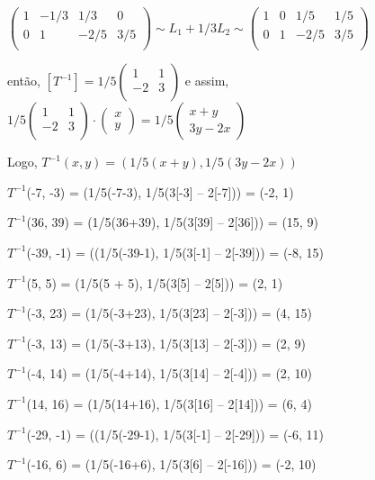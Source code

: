 $
\begin{pmatrix}
	1 & -1/3 & 1/3 & 0 \\
	0 & 1 & -2/5 & 3/5 \\
\end{pmatrix}
\sim L_1 + 1/3 L_2 \sim
\begin{pmatrix}
	1 & 0 & 1/5 & 1/5 \\
	0 & 1 & -2/5 & 3/5 \\
\end{pmatrix}
$

\noindent então, 
$[T^{-1}] = 1/5
\begin{pmatrix}
	1 & 1 \\
	-2 & 3 \\
\end{pmatrix}
$ e assim, $1/5
\begin{pmatrix}
	1 & 1 \\
	-2 & 3 \\
\end{pmatrix}
	\cdot
\begin{pmatrix}
	x \\ y
\end{pmatrix}
= 1/5\begin{pmatrix}
	x + y \\
	3y -2x
\end{pmatrix}
$

Logo, $T^{-1}(x, y) = (1/5(x + y), 1/5(3y -2x))$

\centerline{$T^{-1}$(-7, -3) = (1/5(-7-3), 1/5(3[-3] – 2[-7])) = (-2, 1)}

\centerline{$T^{-1}$(36, 39) = (1/5(36+39), 1/5(3[39] – 2[36])) = (15, 9)}

\centerline{$T^{-1}$(-39, -1) = ((1/5(-39-1), 1/5(3[-1] – 2[-39])) = (-8, 15)}

\centerline{$T^{-1}$(5, 5) = (1/5(5 + 5), 1/5(3[5] – 2[5])) = (2, 1)}

\centerline{$T^{-1}$(-3, 23) = (1/5(-3+23), 1/5(3[23] – 2[-3])) = (4, 15)}

\centerline{$T^{-1}$(-3, 13) = (1/5(-3+13), 1/5(3[13] – 2[-3])) = (2, 9)}

\centerline{$T^{-1}($-4, 14) = (1/5(-4+14), 1/5(3[14] – 2[-4])) = (2, 10)}

\centerline{$T^{-1}$(14, 16) = (1/5(14+16), 1/5(3[16] – 2[14])) = (6, 4)}

\centerline{$T^{-1}$(-29, -1) = ((1/5(-29-1), 1/5(3[-1] – 2[-29])) = (-6, 11)}

\centerline{$T^{-1}$(-16, 6) = (1/5(-16+6), 1/5(3[6] – 2[-16])) = (-2, 10)}

